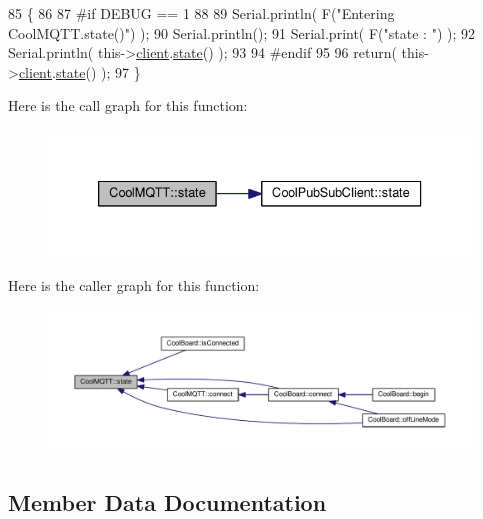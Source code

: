 \begin{DoxyCode}
85 \{
86 
87 \textcolor{preprocessor}{#if DEBUG == 1 }
88 
89     Serial.println( F(\textcolor{stringliteral}{"Entering CoolMQTT.state()"}) );
90     Serial.println();   
91     Serial.print( F(\textcolor{stringliteral}{"state : "}) );
92     Serial.println( this->\hyperlink{class_cool_m_q_t_t_afed1372683c44893b4668d0f1771f514}{client}.\hyperlink{class_cool_pub_sub_client_a3245a5afc6d22e61270dcfe392ccb866}{state}() );
93 
94 \textcolor{preprocessor}{#endif}
95     
96     \textcolor{keywordflow}{return}( this->\hyperlink{class_cool_m_q_t_t_afed1372683c44893b4668d0f1771f514}{client}.\hyperlink{class_cool_pub_sub_client_a3245a5afc6d22e61270dcfe392ccb866}{state}() );
97 \}
\end{DoxyCode}
Here is the call graph for this function\+:\nopagebreak
\begin{figure}[H]
\begin{center}
\leavevmode
\includegraphics[width=333pt]{d0/dd0/class_cool_m_q_t_t_a5d003307eff78efbd585e42b43b72b6d_cgraph}
\end{center}
\end{figure}
Here is the caller graph for this function\+:\nopagebreak
\begin{figure}[H]
\begin{center}
\leavevmode
\includegraphics[width=350pt]{d0/dd0/class_cool_m_q_t_t_a5d003307eff78efbd585e42b43b72b6d_icgraph}
\end{center}
\end{figure}


\subsection{Member Data Documentation}
\mbox{\label{class_cool_m_q_t_t_a7f3cf26b51d6770f216e42c5ef13ca9f}} 
